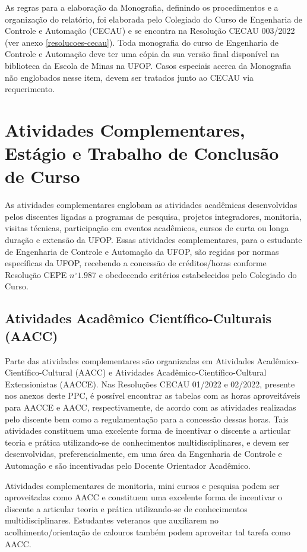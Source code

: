 \documentclass[
	12pt,				%
	openright,			%
	oneside,			%
	a4paper,			%
	english,			%
	brazil				%
	]{abntex2}
\begin{document}
As regras para a elaboração da Monografia, definindo os procedimentos e a organização do relatório, foi elaborada pelo Colegiado do Curso de Engenharia de Controle e Automação (CECAU) e se encontra na Resolução CECAU 003/2022 (ver anexo \ref{resolucoes-cecau}). Toda monografia do curso de Engenharia de Controle e Automação deve ter uma cópia da sua versão final disponível na biblioteca da Escola de Minas na UFOP. Casos especiais acerca da Monografia não englobados nesse item, devem ser tratados junto ao CECAU via requerimento.
%

\section[Atividades Complementares]{Atividades Complementares, Estágio e Trabalho de Conclusão de Curso}

As atividades complementares englobam as atividades acadêmicas desenvolvidas pelos discentes ligadas a programas de pesquisa, projetos integradores, monitoria, visitas técnicas, participação em eventos acadêmicos, cursos de curta ou longa duração e extensão da UFOP. Essas atividades complementares, para o estudante de Engenharia de Controle e Automação da UFOP, são regidas por normas específicas da UFOP, recebendo a concessão de créditos/horas conforme Resolução CEPE $n^{\circ} 1.987$ e obedecendo critérios estabelecidos pelo Colegiado do Curso.

\subsection{Atividades Acadêmico Científico-Culturais (AACC)}
Parte das atividades complementares são organizadas em Atividades Acadêmico-Científico-Cultural (AACC) e Atividades Acadêmico-Científico-Cultural Extensionistas (AACCE). Nas Resoluções CECAU 01/2022 e 02/2022, presente nos anexos deste PPC, é possível encontrar as tabelas com as horas aproveitáveis para AACCE e AACC, respectivamente, de acordo com as atividades realizadas pelo discente bem como a regulamentação para a concessão dessas horas. Tais atividades constituem uma excelente forma de incentivar o discente a articular teoria e prática utilizando-se de conhecimentos multidisciplinares, e devem ser desenvolvidas, preferencialmente, em uma área da Engenharia de Controle e Automação e são incentivadas pelo Docente Orientador Acadêmico.

Atividades complementares de monitoria, mini cursos e pesquisa podem ser aproveitadas como AACC e constituem uma excelente forma de incentivar o discente a articular teoria e prática utilizando-se de conhecimentos multidisciplinares. Estudantes veteranos que auxiliarem no acolhimento/orientação de calouros também podem aproveitar tal tarefa como AACC.
\end{document}
